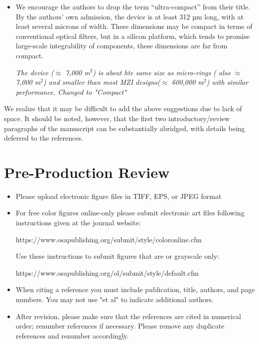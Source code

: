 \documentclass[]{article}
\begin{document}
\begin{itemize}
\item We encourage the authors to drop the term “ultra-compact” from their title. By the authors’ own admission, the device is at least 312 µm long, with at least several microns of width. These dimensions may be compact in terms of conventional optical filters, but in a silicon platform, which tends to promise large-scale integrability of components, these dimensions are far from compact.

\emph{The device ($\approx$ 7,000 \textmu m$^2$) is about hte same size as micro-rings ( also $\approx$ 7,000 \textmu m$^2$) and smaller than most MZI designs($\approx$ 600,000 \textmu m$^2$) with similar performance. Changed to "Compact" }
\end{itemize}


We realize that it may be difficult to add the above suggestions due to lack of space. It should be noted, however, that the first two introductory/review paragraphs of the manuscript can be substantially abridged, with details being deferred to the references.


\section*{Pre-Production Review}
\begin{itemize}
\item Please upload electronic figure files in TIFF, EPS, or JPEG format

\item For free color figures online-only please submit electronic art files following instructions given at the journal website:

 https://www.osapublishing.org/submit/style/coloronline.cfm 
 
Use these instructions to submit figures that are or grayscale only:

 https://www.osapublishing.org/ol/submit/style/default.cfm

\item When citing a reference you must include publication, title, authors, and page numbers. You may not use "et al" to indicate additional authors.

\item After revision, please make sure that the references are cited in numerical order; renumber references if necessary. Please remove any duplicate references and renumber accordingly.
\end{itemize}



\end{document}
